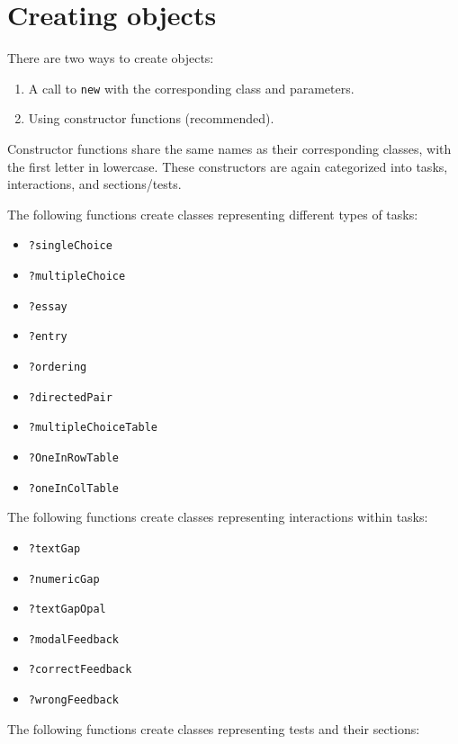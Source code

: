 \documentclass[twoside]{tufte-book}
\providecommand{\tightlist}{%
  \setlength{\itemsep}{0pt}\setlength{\parskip}{0pt}}
\begin{document}
\section{Creating objects}\label{creating-objects}

There are two ways to create objects:

\begin{enumerate}
\def\labelenumi{\arabic{enumi}.}
\tightlist
\item
  A call to \texttt{new} with the corresponding class and parameters.
\item
  Using constructor functions (recommended).
\end{enumerate}

Constructor functions share the same names as their corresponding classes, with the first letter in lowercase. These constructors are again categorized into tasks, interactions, and sections/tests.

The following functions create classes representing different types of tasks:

\begin{itemize}
\tightlist
\item
  \texttt{?singleChoice}
\item
  \texttt{?multipleChoice}
\item
  \texttt{?essay}
\item
  \texttt{?entry}
\item
  \texttt{?ordering}
\item
  \texttt{?directedPair}
\item
  \texttt{?multipleChoiceTable}
\item
  \texttt{?OneInRowTable}
\item
  \texttt{?oneInColTable}
\end{itemize}

The following functions create classes representing interactions within tasks:

\begin{itemize}
\tightlist
\item
  \texttt{?textGap}
\item
  \texttt{?numericGap}
\item
  \texttt{?textGapOpal}
\item
  \texttt{?modalFeedback}
\item
  \texttt{?correctFeedback}
\item
  \texttt{?wrongFeedback}
\end{itemize}

The following functions create classes representing tests and their sections:
\end{document}
